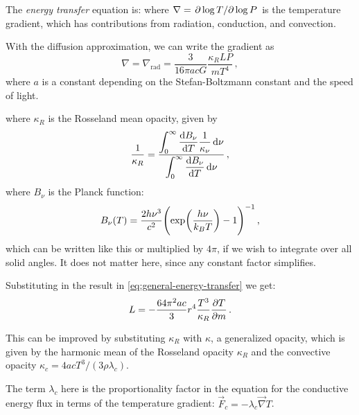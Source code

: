 \documentclass[main.tex]{subfiles}
\begin{document}
The \emph{energy transfer} equation is:
%
%
where \(\nabla = \pdv*{\log T}{\log P} \) is the temperature gradient, which has contributions from radiation, conduction, and convection.

With the diffusion approximation, we can write the gradient as
%
\begin{equation} \label{eq:diffusion-approx-gradient}
    \nabla = \nabla_{\text{rad}} = \frac{3}{16 \pi a c G} \frac{\kappa_R L P}{mT^4} \,,
\end{equation}
%
where \(a\) is a constant depending on the Stefan-Boltzmann constant and the speed of light.

%
where \(\kappa_R\) is the Rosseland mean opacity, given by
%
\begin{equation}
  \frac{1}{\kappa_{R}} =
  \frac{ \displaystyle\int _{0}   ^{\infty}  \dv{B_\nu}{T} \frac{1}{\kappa_\nu} \dd{\nu}}
  {  \displaystyle \int _{0}   ^{\infty} \dv{B_\nu}{T} \dd{\nu}}\,,
\end{equation}
%
where \(B_{\nu }\) is the Planck function: 
%
\begin{align}
B_{\nu } (T) = \frac{2 h \nu^3}{ c^2} \qty(\exp(\frac{h \nu }{k_B T}) - 1)^{-1}
\,,
\end{align}
%
which can be written like this or multiplied by \(4 \pi  \), if we wish to integrate over all solid angles. It does not matter here, since any constant factor simplifies. 

Substituting in the result in \eqref{eq:general-energy-transfer} we get:
%
\begin{equation} \label{eq:luminosity-equation}
    L = - \frac{64 \pi^2 a c }{3} r^4 \frac{T^3}{\kappa_R} \pdv{T}{m}
\,.
\end{equation}

This can be improved by substituting \(\kappa_{R}   \) with \(\kappa\), a generalized opacity, which is given by the harmonic mean of the Rosseland opacity \(\kappa _R \) and the convective opacity \(\kappa_c = 4acT^3 / (3 \rho \lambda_c )\).

The term \(\lambda_{c}\) here is the proportionality factor in the equation for the conductive energy flux in terms of the temperature gradient: \(\vec{F}_{c} = - \lambda_{c} \vec{\nabla} T\). 
\end{document}
